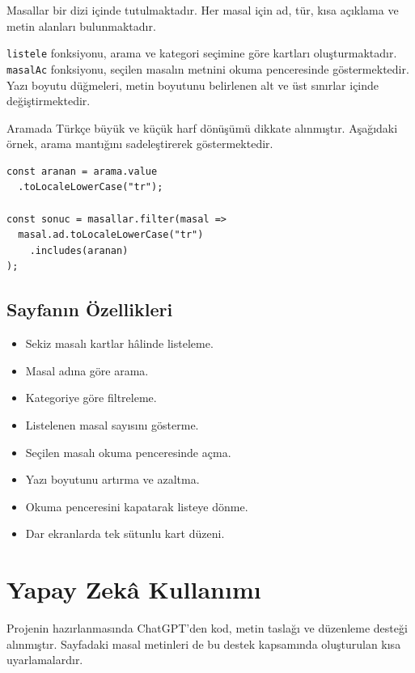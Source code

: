 \documentclass[12pt,a4paper]{article}
\begin{document}
Masallar bir dizi içinde tutulmaktadır.
Her masal için ad, tür, kısa açıklama ve
metin alanları bulunmaktadır.

\texttt{listele} fonksiyonu, arama ve kategori
seçimine göre kartları oluşturmaktadır.
\texttt{masalAc} fonksiyonu, seçilen masalın
metnini okuma penceresinde göstermektedir.
Yazı boyutu düğmeleri, metin boyutunu belirlenen
alt ve üst sınırlar içinde değiştirmektedir.

Aramada Türkçe büyük ve küçük harf dönüşümü
dikkate alınmıştır. Aşağıdaki örnek, arama
mantığını sadeleştirerek göstermektedir.

\begin{lstlisting}[caption={Masal adına göre arama mantığı}]
const aranan = arama.value
  .toLocaleLowerCase("tr");

const sonuc = masallar.filter(masal =>
  masal.ad.toLocaleLowerCase("tr")
    .includes(aranan)
);
\end{lstlisting}

\subsection{Sayfanın Özellikleri}

\begin{itemize}
\item Sekiz masalı kartlar hâlinde listeleme.
\item Masal adına göre arama.
\item Kategoriye göre filtreleme.
\item Listelenen masal sayısını gösterme.
\item Seçilen masalı okuma penceresinde açma.
\item Yazı boyutunu artırma ve azaltma.
\item Okuma penceresini kapatarak listeye dönme.
\item Dar ekranlarda tek sütunlu kart düzeni.
\end{itemize}

\section{Yapay Zekâ Kullanımı}

Projenin hazırlanmasında ChatGPT'den kod,
metin taslağı ve düzenleme desteği alınmıştır.
Sayfadaki masal metinleri de bu destek kapsamında
oluşturulan kısa uyarlamalardır.
\end{document}
